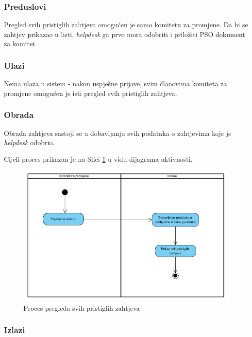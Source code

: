 \documentclass[12pt,a4paper]{article}
\begin{document}
\subsubsection{Preduslovi}

Pregled svih pristiglih zahtjeva omogućen je samo komitetu za promjene. Da bi se zahtjev prikazao u listi, \textit{helpdesk} ga prvo mora odobriti i priložiti PSO dokument za komitet.

\subsubsection{Ulazi}

Nema ulaza u sistem - nakon uspješne prijave, svim članovima komiteta za promjene omogućen je isti pregled svih pristiglih zahtjeva.

\subsubsection{Obrada}

Obrada zahtjeva sastoji se u dobavljanju svih podataka o zahtjevima koje je \textit{helpdesk} odobrio.

Cijeli proces prikazan je na Slici \ref{act7} u vidu dijagrama aktivnosti.

\begin{figure}[H]
\center
\includegraphics[scale=0.5]{../res/Activity/activity7.JPG}
\caption{Proces pregleda svih pristiglih zahtjeva}
\label{act7}
\end{figure}

\subsubsection{Izlazi}
\end{document}
